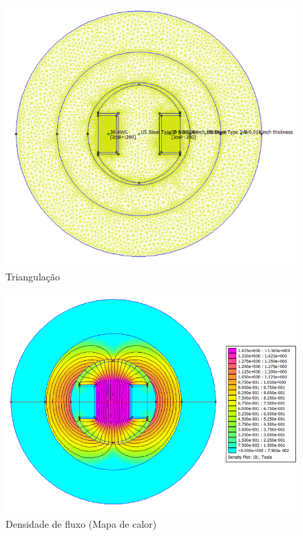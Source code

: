\begin{figure}[H]
\centering
\includegraphics[scale=0.7]{img/assig4/triang.png}
\caption[Triangulação]{Triangulação}
\label{}
\end{figure}

\begin{figure}[H]
\centering
\includegraphics[scale=0.7]{img/assig4/femm_f.png}
\caption[Densidade de fluxo (Mapa de calor)]{Densidade de fluxo (Mapa de calor)}
\label{}
\end{figure}
%

